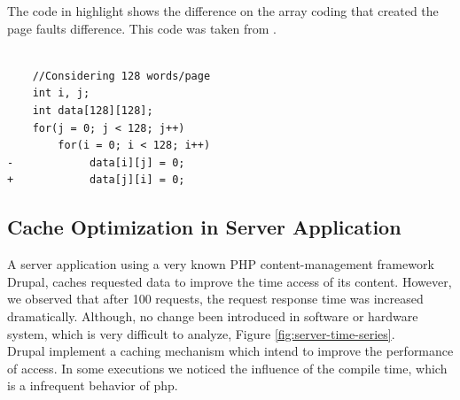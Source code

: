  The code in highlight shows the difference on the array coding that created the page faults difference. This code was taken from \cite{essentials}.


    

\lstset{language=diff}
\begin{lstlisting}[caption={Page fault interference - code changes}, label=pseudo:page-faults, captionpos=b]

    //Considering 128 words/page
    int i, j;
    int data[128][128]; 
    for(j = 0; j < 128; j++)
        for(i = 0; i < 128; i++)
-            data[i][j] = 0;
+            data[j][i] = 0;
\end{lstlisting}

\subsection{\textbf{Cache Optimization in Server Application}}
    A server application using a very known PHP content-management framework Drupal, caches requested data to improve the time access of its content. However, we observed that after 100 requests, the request response time was increased dramatically. Although, no change been introduced in software or hardware system, which is very difficult to analyze, Figure \ref{fig:server-time-series}.\\
    Drupal implement a caching mechanism which intend to improve the performance of access. In some executions we noticed the influence of the compile time, which is a infrequent behavior of php.
    
